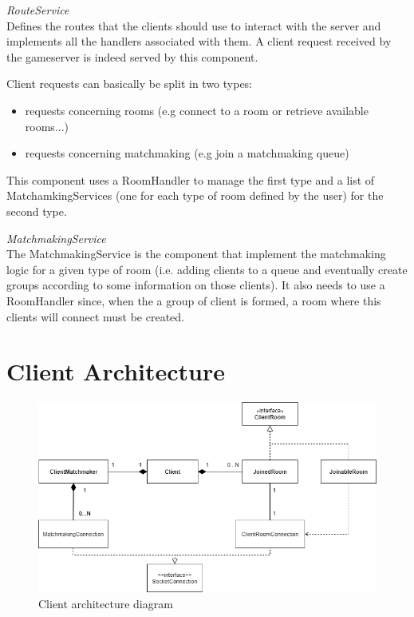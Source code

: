 \bigskip
\textit{RouteService}
\\
Defines the routes that the clients should use to interact with the server and implements all the handlers associated with them. A client request received by the gameserver is indeed served by this component. 

Client requests can basically be split in two types:
\begin{itemize}
	\item requests concerning rooms (e.g connect to a room or retrieve available rooms...)
	\item requests concerning matchmaking (e.g join a matchmaking queue)
\end{itemize}
This component uses a RoomHandler to manage the first type and a list of MatchamkingServices (one for each type of room defined by the user) for the second type. 

\bigskip
\textit{MatchmakingService}
\\
The MatchmakingService is the component that implement the matchmaking logic for a given type of room (i.e. adding clients to a queue and eventually create groups according to some information on those clients). It also needs to use a RoomHandler since, when the a group of client is formed, a room where this clients will connect must be created.



\section{Client Architecture}

\begin{figure}[]
	\centering
	\includegraphics[scale=0.65]{images/3-architecture/client-architecture.png}
	\caption{Client architecture diagram}
	\label{fig:client_architecture}
\end{figure}

